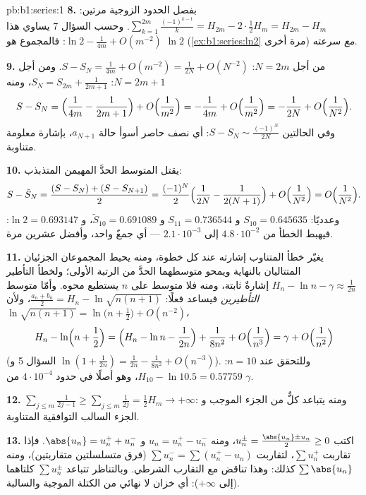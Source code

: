 \begin{solution}{pb:b1:series:1}
\textbf{8.} بفصل الحدود الزوجية مرتين:
$\sum_{k=1}^{2m}\frac{(-1)^{k-1}}{k} = H_{2m} - 2\cdot\frac12
H_m = H_{2m} - H_m$. وحسب السؤال 7 يساوي هذا $\ln 2 -
\frac{1}{4m} + O(m^{-2})$: فالمجموع هو $\ln 2$
(\cref{ex:b1:series:ln2} مرة أخرى) \emph{مع} سرعته.

\textbf{9.} من أجل $N = 2m$: $S - S_N = \frac{1}{4m} + O(m^{-2}) =
\frac{1}{2N} + O(N^{-2})$. ومن أجل $N = 2m + 1$: $S_{N} = S_{2m} +
\frac{1}{2m+1}$، ومنه
\[
S - S_N = \Bigl(\frac{1}{4m} - \frac{1}{2m+1}\Bigr) +
O\Bigl(\frac{1}{m^2}\Bigr)
= -\frac{1}{4m} + O\Bigl(\frac{1}{m^2}\Bigr)
= -\frac{1}{2N} + O\Bigl(\frac{1}{N^2}\Bigr).
\]
وفي الحالتين $S - S_N \sim \frac{(-1)^N}{2N}$: أي نصف
حاصر أسوأ حالة $a_{N+1}$، بإشارة معلومة متناوبة.

\textbf{10.} يقتل المتوسط الحدَّ المهيمن المتذبذب:
\[
S - \tilde S_N = \frac{(S - S_N) + (S - S_{N+1})}{2}
= \frac{(-1)^N}{2}\Bigl(\frac{1}{2N} - \frac{1}{2(N+1)}\Bigr)
+ O\Bigl(\frac{1}{N^2}\Bigr) = O\Bigl(\frac{1}{N^2}\Bigr).
\]
وعدديًا: $S_{10} = 0.645635$ و $S_{11} = 0.736544$ و $\tilde
S_{10} = 0.691089$، و $\ln 2 = 0.693147$: فيهبط الخطأ من
$4.8\cdot10^{-2}$ إلى $2.1\cdot10^{-3}$ --- أي جمعٌ واحد، وأفضل عشرين
مرة.

\textbf{11.} يغيّر خطأ المتناوب إشارته عند كل خطوة،
ومنه يحيط المجموعان الجزئيان المتتاليان بالنهاية ويمحو متوسطهما
الحدَّ من الرتبة الأولى؛ ولخطأ التأطير $H_n - \ln n -
\gamma \approx \frac{1}{2n}$ إشارةٌ ثابتة، ومنه فلا متوسط
على $n$ يستطيع محوه. وأمّا متوسط \emph{التأطيرين} فيساعد
فعلًا: $\frac{a_n + b_n}{2} = H_n - \ln\sqrt{n(n+1)}$، ولأن
$\ln\sqrt{n(n+1)} = \ln\bigl(n + \frac12\bigr) + O(n^{-2})$،
\[
H_n - \ln\Bigl(n + \frac12\Bigr)
= \Bigl(H_n - \ln n - \frac{1}{2n}\Bigr) + \frac{1}{8n^2} +
O\Bigl(\frac{1}{n^3}\Bigr) = \gamma + O\Bigl(\frac{1}{n^2}\Bigr)
\]
(السؤال 5 و $\ln(1 + \frac{1}{2n}) = \frac{1}{2n} -
\frac{1}{8n^2} + O(n^{-3})$). وللتحقق عند $n = 10$: $H_{10} -
\ln 10.5 = 0.57759$، وهو أصلًا في حدود $4\cdot10^{-4}$ من
$\gamma$.

\textbf{12.} $\sum_{j\leq m} \frac{1}{2j-1} \geq \sum_{j \leq m}
\frac{1}{2j} = \frac12 H_m \to +\infty$: ومنه يتباعد كلٌّ من الجزء الموجب و
الجزء السالب  التوافقية المتناوبة.

\textbf{13.} اكتب $u_n^\pm = \frac{\abs{u_n} \pm u_n}{2} \geq
0$، ومنه $u_n = u_n^+ - u_n^-$ و $\abs{u_n} = u_n^+ + u_n^-$. فإذا
تقاربت $\sum u_n^+$، لتقاربت $\sum u_n^- = \sum (u_n^+ - u_n)$
(فرق متسلسلتين متقاربتين)، ومنه $\sum
\abs{u_n}$ كذلك: وهذا تناقض مع التقارب الشرطي. وبالتناظر
تتباعد $\sum u_n^\pm$ كلتاهما (إلى $+\infty$): أي خزان
لا نهائي من الكتلة الموجبة والسالبة.


\end{solution}
